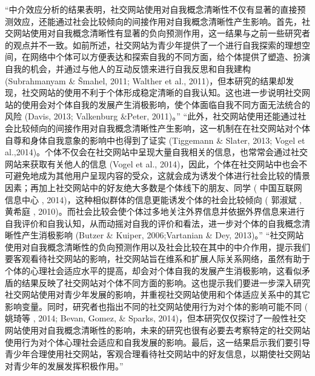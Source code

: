 “中介效应分析的结果表明，社交网站使用对自我概念清晰性不仅有显著的直接预测效应，还能通过社会比较倾向的间接作用对自我概念清晰性产生影响。首先，社交网站使用对自我概念清晰性有显著的负向预测作用，这一结果与之前一些研究者的观点并不一致。如前所述，社交网站为青少年提供了一个进行自我探索的理想空间，在网络中个体可以方便表达和探索自我的不同方面，给个体提供了塑造、扮演自我的机会，并通过与他人的互动反馈来进行自我反思和自我建构 (Subrahmanyam \& \v{S}mahel, 2011; Walther et al., 2011)，但本研究的结果却发现，社交网站的使用不利于个体形成稳定清晰的自我认知。这也进一步说明社交网站的使用会对个体自我的发展产生消极影响，使个体面临自我不同方面无法统合的风险 (Davis, 2013; Valkenburg \&Peter, 2011)。”
“此外，社交网站使用还能通过社会比较倾向的间接作用对自我概念清晰性产生影响，这一机制在在社交网站对个体自尊和身体自我意象的影响中也得到了证实 (Tiggemann \& Slater, 2013; Vogel et al.,2014)。个体不仅会在社交网站中呈现大量自我相关的信息，也常常会通过社交网站来获取有关他人的信息 (Vogel et al., 2014)，因此，个体在社交网站中也会不可避免地成为其他用户呈现内容的受众，这就会成为诱发个体进行社会比较的情景因素；再加上社交网站中的好友绝大多数是个体线下的朋友、同学 ( 中国互联网信息中心 , 2014)，这种相似群体的信息更能诱发个体的社会比较倾向 ( 郭淑斌 , 黄希庭 , 2010)。而社会比较会使个体过多地关注外界信息并依据外界信息来进行自我评价和自我认知，从而动摇对自我的评价和看法，进一步对个体的自我概念清晰性产生消极影响 (Butzer \& Kuiper, 2006;Vartanian \& Dey, 2013)。”
“社交网站使用对自我概念清晰性的负向预测作用以及社会比较在其中的中介作用，提示我们要客观看待社交网站的影响，社交网站旨在维系和扩展人际关系网络，虽然有助于个体的心理社会适应水平的提高，却会对个体自我的发展产生消极影响，这看似矛盾的结果反映了社交网站对个体不同方面的影响。这也提示我们要进一步深入研究社交网站使用对青少年发展的影响，并重视社交网站使用和个体适应关系中的其它影响变量。同时，研究者也指出不同的社交网站使用行为对个体的影响可能不同 ( 姚琦等 , 2014; Bevan, Gomez, \& Sparks, 2014)，但本研究仅仅探讨了一般性社交网站使用对自我概念清晰性的影响，未来的研究也很有必要去考察特定的社交网站使用行为对个体心理社会适应和自我发展的影响。最后，这一结果启示我们要引导青少年合理使用社交网站，客观合理看待社交网站中的好友信息，以期使社交网站对青少年的发展发挥积极作用。”\cite{牛更枫2016青少年社交网站使用对自我概念清晰性的影响}

